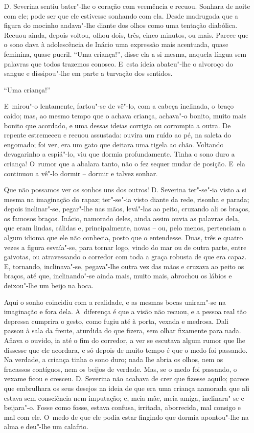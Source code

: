 D. Severina sentiu bater"-lhe o coração com veemência e recuou. Sonhara
de noite com ele; pode ser que ele estivesse sonhando com ela. Desde
madrugada que a figura do mocinho andava"-lhe diante dos olhos como uma
tentação diabólica. Recuou ainda, depois voltou, olhou dois, três, cinco
minutos, ou mais. Parece que o sono dava à adolescência de Inácio uma
expressão mais acentuada, quase feminina, quase pueril. ``Uma
criança!'', disse ela a si mesma, naquela língua sem palavras que todos
trazemos conosco. E~esta ideia abateu"-lhe o alvoroço do sangue e
dissipou"-lhe em parte a turvação dos sentidos.

``Uma criança!''

E~mirou"-o lentamente, fartou"-se de vê"-lo, com a cabeça inclinada, o
braço caído; mas, ao mesmo tempo que o achava criança, achava"-o bonito,
muito mais bonito que acordado, e uma dessas ideias corrigia ou
corrompia a outra. De repente estremeceu e recuou assustada: ouvira um
ruído ao pé, na saleta do engomado; foi ver, era um gato que deitara uma
tigela ao chão. Voltando devagarinho a espiá"-lo, viu que dormia
profundamente. Tinha o sono duro a criança! O~rumor que a abalara tanto,
não o fez sequer mudar de posição. E~ela continuou a vê"-lo dormir --
dormir e talvez sonhar.

Que não possamos ver os sonhos uns dos outros! D. Severina ter"-se"-ia
visto a si mesma na imaginação do rapaz; ter"-se"-ia visto diante da rede,
risonha e parada; depois inclinar"-se, pegar"-lhe nas mãos, levá"-las ao
peito, cruzando ali os braços, os famosos braços. Inácio, namorado
deles, ainda assim ouvia as palavras dela, que eram lindas, cálidas e,
principalmente, novas -- ou, pelo menos, pertenciam a algum idioma que
ele não conhecia, posto que o entendesse. Duas, três e quatro vezes a
figura esvaía"-se, para tornar logo, vindo do mar ou de outra parte,
entre gaivotas, ou atravessando o corredor com toda a graça robusta de
que era capaz. E, tornando, inclinava"-se, pegava"-lhe outra vez das mãos
e cruzava ao peito os braços, até que, inclinando"-se ainda mais, muito
mais, abrochou os lábios e deixou"-lhe um beijo na boca.

Aqui o sonho coincidiu com a realidade, e as mesmas bocas uniram"-se na
imaginação e fora dela. A~diferença é que a visão não recuou, e a pessoa
real tão depressa cumprira o gesto, como fugiu até à porta, vexada e
medrosa. Dali passou à sala da frente, aturdida do que fizera, sem olhar
fixamente para nada. Afiava o ouvido, ia até o fim do corredor, a ver se
escutava algum rumor que lhe dissesse que ele acordara, e só depois de
muito tempo é que o medo foi passando. Na verdade, a criança tinha o
sono duro; nada lhe abria os olhos, nem os fracassos contíguos, nem os
beijos de verdade. Mas, se o medo foi passando, o vexame ficou e
cresceu. D. Severina não acabava de crer que fizesse aquilo; parece que
embrulhara os seus desejos na ideia de que era uma criança namorada que
ali estava sem consciência nem imputação; e, meia mãe, meia amiga,
inclinara"-se e beijara"-o. Fosse como fosse, estava confusa, irritada,
aborrecida, mal consigo e mal com ele. O~medo de que ele podia estar
fingindo que dormia apontou"-lhe na alma e deu"-lhe um calafrio.

